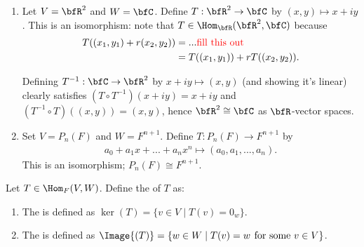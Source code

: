     \begin{example}
        \phantom{a}
        \begin{enumerate}[label = (\arabic*)]
            \item Let $V = \bfR^2$ and $W = \bfC$. Define $T:\bfR^2 \rightarrow \bfC$ by $(x,y) \mapsto x+iy$. This is an isomorphism: note that $T \in \Hom_{\bfR}{(\bfR^2 , \bfC)}$ because 
                \begin{equation*}
                \begin{split}
                    T((x_1,y_1) + r(x_2,y_2)) &= ...\text{\color{red} fill this out}  \\ 
                    &= T((x_1,y_1))+r T((x_2,y_2)).
                \end{split}
                \end{equation*}
            
            
            Defining $T^{-1}:\bfC \rightarrow \bfR^2$ by $x+iy \mapsto (x,y)$ (and showing it's linear) clearly satisfies $(T\circ T^{-1})(x+iy) = x+iy$ and $(T^{-1} \circ T)((x,y)) = (x,y)$, hence $\bfR^2 \cong \bfC$ as $\bfR$-vector spaces.
            \item Set $V = P_n(F)$ and $W = F^{n+1}$. Define $T:P_n(F) \rightarrow F^{n+1}$ by 
                \begin{equation*}
                \begin{split}
                    a_0 + a_1 x + ... + a_n x^n \mapsto (a_0,a_1,...,a_n).
                \end{split}
                \end{equation*}
            This is an isomorphism; $P_n(F) \cong F^{n+1}$.
        \end{enumerate}
    \end{example}

    \begin{definition}
        Let $T \in \Hom_F{(V,W)}$. Define the  of $T$ as:
            \begin{enumerate}[label = (\arabic*)]
                \item The  is defined as $\ker{(T)} = \{v \in V \mid T(v) = 0_w\}$.
                \item The  is defined as $\Image{(T)} = \{w \in W \mid T(v) = w \hspace{4pt} \text{for some $v \in V$} \}$.
            \end{enumerate}
    \end{definition}


